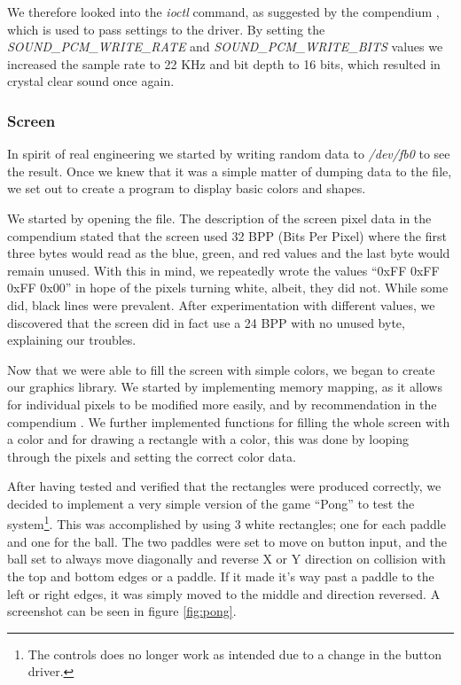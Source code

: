 \documentclass[a4paper,12pt]{article}
\begin{document}
We therefore looked into the \emph{ioctl} command, as suggested by the compendium \cite[p.60]{compendium}, which is used to pass settings to the driver. By setting the \emph{SOUND\_PCM\_WRITE\_RATE} and \emph{SOUND\_PCM\_WRITE\_BITS} values we increased the sample rate to 22 KHz and bit depth to 16 bits, which resulted in crystal clear sound once again.

\subsubsection{Screen} %

In spirit of real engineering we started by writing random data to \emph{/dev/fb0} to see the result. Once we knew that it was a simple matter of dumping data to the file, we set out to create a program to display basic colors and shapes.

We started by opening the file. The description of the screen pixel data in the compendium \cite[p.60]{compendium} stated that the screen used 32 BPP (Bits Per Pixel) where the first three bytes would read as the blue, green, and red values and the last byte would remain unused. With this in mind, we repeatedly wrote the values “0xFF 0xFF 0xFF 0x00” in hope of the pixels turning white, albeit, they did not. While some did, black lines were prevalent. After experimentation with different values, we discovered that the screen did in fact use a 24 BPP with no unused byte, explaining our troubles.

Now that we were able to fill the screen with simple colors, we began to create our graphics library. We started by implementing memory mapping, as it allows for individual pixels to be modified more easily, and by recommendation in the compendium \cite[p.60]{compendium}. We further implemented functions for filling the whole screen with a color and for drawing a rectangle with a color, this was done by looping through the pixels and setting the correct color data.

After having tested and verified that the rectangles were produced correctly, we decided to implement a very simple version of the game “Pong” to test the system\footnote{The controls does no longer work as intended due to a change in the button driver.}. This was accomplished by using 3 white rectangles; one for each paddle and one for the ball. The two paddles were set to move on button input, and the ball set to always move diagonally and reverse X or Y direction on collision with the top and bottom edges or a paddle. If it made it's way past a paddle to the left or right edges, it was simply moved to the middle and direction reversed. A screenshot can be seen in figure \ref{fig:pong}.
 
\end{document}
